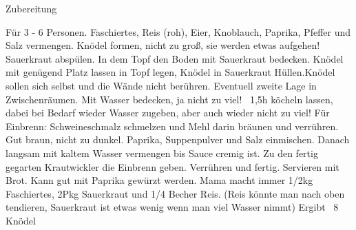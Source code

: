 {\Large Zubereitung} \newline
\begin{addmargin}[1cm]{0cm}
	Für 3 - 6 Personen.
	Faschiertes, Reis (roh), Eier, Knoblauch, Paprika, Pfeffer und Salz vermengen. Knödel formen, nicht
	zu groß, sie werden etwas aufgehen!\newline
	Sauerkraut abspülen.\newline
	In dem Topf den Boden mit Sauerkraut bedecken.
	Knödel mit genügend Platz lassen in Topf legen, Knödel in Sauerkraut Hüllen.\newline Knödel sollen sich
	selbst und die Wände nicht berühren.\newline
	Eventuell zweite Lage in Zwischenräumen.\newline
	Mit Wasser bedecken, ja nicht zu viel!\newline
	~1,5h köcheln lassen, dabei bei Bedarf wieder Wasser zugeben, aber auch wieder nicht zu viel!\newline\newline
	Für Einbrenn:\newline
	Schweineschmalz schmelzen und Mehl darin bräunen und verrühren. Gut braun, nicht zu dunkel.\newline
	Paprika, Suppenpulver und Salz einmischen.\newline
	Danach langsam mit kaltem Wasser vermengen bis Sauce cremig ist.\newline
	Zu den fertig gegarten Krautwickler die Einbrenn geben. Verrühren und fertig.\newline
	Servieren mit Brot. Kann gut mit Paprika gewürzt werden.\newline\newline
	Mama macht immer 1/2kg Faschiertes, 2Pkg Sauerkraut und 1/4 Becher Reis.
	(Reis könnte man nach oben tendieren, Sauerkraut ist etwas wenig wenn man viel Wasser nimmt)
	Ergibt ~8 Knödel
	
	
	
\end{addmargin}
